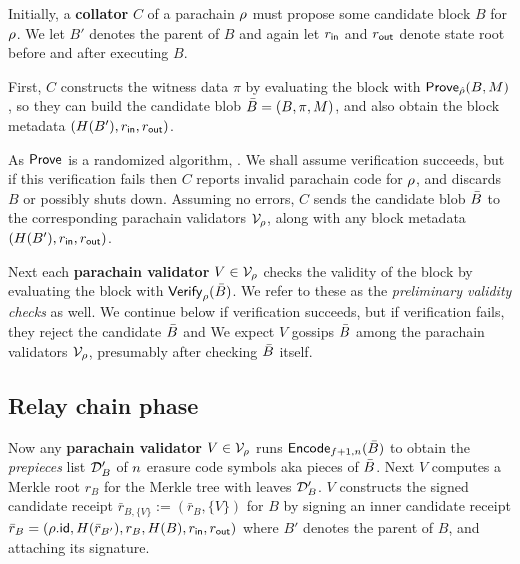 Initially, a {\bf collator} $C$ of a parachain $\rho$ must propose some candidate block $B$ for $\rho$.  We let $B'$ denotes the parent of $B$ and again let $r_{\mathsf{in}}$ and $r_{\mathsf{out}}$ denote state root before and after executing $B$.  

First, $C$ constructs the witness data $\pi$ by evaluating the block with $\mathsf{Prove}_{\hat{\rho}}(B,M)$, so they can build the candidate blob $\bar{B} = (B,\pi,M)$, and also obtain the block metadata $(H(B'),r_{\mathsf{in}},r_{\mathsf{out}})$.  

As $\mathsf{Prove}$ is a randomized algorithm, .  We shall assume verification succeeds, but if this verification fails then $C$ reports invalid parachain code for $\rho$, and discards $B$ or possibly shuts down.  Assuming no errors, $C$ sends the candidate blob $\bar{B}$ to the corresponding parachain validators $\mathcal{V}_{\rho}$, along with any block metadata $(H(B'),r_{\mathsf{in}},r_{\mathsf{out}})$. 

\smallskip

Next each {\bf parachain validator} $V \in \mathcal{V}_{\rho}$ checks the validity of the block by evaluating the block with $\mathsf{Verify}_{\rho}(\bar{B})$.  We refer to these as the {\em preliminary validity checks} as well.  We continue below if verification succeeds, but if verification fails, they reject the candidate $\bar{B}$ and   We expect $V$ gossips $\bar{B}$ among the parachain validators $\mathcal{V}_{\rho}$, presumably after checking $\bar{B}$ itself.

\subsection{Relay chain phase} %


Now any {\bf parachain validator} $V \in \mathcal{V}_{\rho}$ runs $\mathsf{Encode}_{f+1,n}(\bar{B})$ to obtain the {\em prepieces} list $\mathcal{D}'_B$ of $n$ erasure code symbols aka pieces of $\bar{B}$.  Next $V$ computes a Merkle root $r_B$ for the Merkle tree with leaves $\mathcal{D}'_B$.  $V$ constructs the signed candidate receipt $\bar{r}_{B,\{V\}} := (\bar{r}_{B},\{V\})$ for $B$ by signing an inner candidate receipt $\bar{r}_B = (\rho.\mathsf{id},H(\bar{r}_{B'}),r_B,H(B),r_{\mathsf{in}},r_{\mathsf{out}})$ where $B'$ denotes the parent of $B$, and attaching its signature.  


